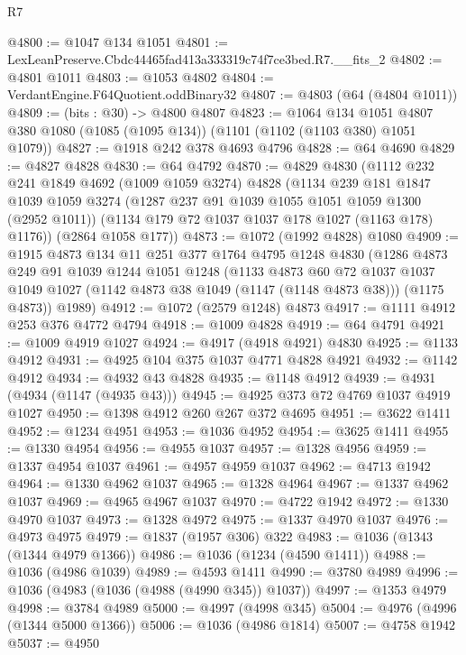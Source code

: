 \begin{lexlean}{R7}
\begin{coremodule}
@4800 := @1047 @134 @1051
@4801 := LexLeanPreserve.Cbdc44465fad413a333319c74f7ce3bed.R7.__fits_2
@4802 := @4801 @1011
@4803 := @1053 @4802
@4804 := VerdantEngine.F64Quotient.oddBinary32
@4807 := @4803 (@64 (@4804 @1011))
@4809 := (bits : @30) -> @4800 @4807
@4823 := @1064
    @134
    @1051
    @4807
    @380
    @1080
    (@1085 (@1095 @134))
    (@1101 (@1102 (@1103 @380) @1051 @1079))
@4827 := @1918 @242 @378 @4693 @4796
@4828 := @64 @4690
@4829 := @4827 @4828
@4830 := @64 @4792
@4870 := @4829
    @4830
    (@1112
      @232
      @241
      @1849
      @4692
      (@1009 @1059 @3274)
      @4828
      (@1134
        @239
        @181
        @1847
        @1039
        @1059
        @3274
        (@1287 @237 @91 @1039 @1055 @1051 @1059 @1300 (@2952 @1011))
        (@1134 @179 @72 @1037 @1037 @178 @1027 (@1163 @178) @1176))
      (@2864 @1058 @177))
@4873 := @1072 (@1992 @4828) @1080
@4909 := @1915
    @4873
    @134
    @11
    @251
    @377
    @1764
    @4795
    @1248
    @4830
    (@1286
      @4873
      @249
      @91
      @1039
      @1244
      @1051
      @1248
      (@1133
        @4873
        @60
        @72
        @1037
        @1037
        @1049
        @1027
        (@1142 @4873 @38 @1049 (@1147 (@1148 @4873 @38)))
        (@1175 @4873))
      @1989)
@4912 := @1072 (@2579 @1248) @4873
@4917 := @1111 @4912 @253 @376 @4772 @4794
@4918 := @1009 @4828
@4919 := @64 @4791
@4921 := @1009 @4919 @1027
@4924 := @4917 (@4918 @4921) @4830
@4925 := @1133 @4912
@4931 := @4925 @104 @375 @1037 @4771 @4828 @4921
@4932 := @1142 @4912
@4934 := @4932 @43 @4828
@4935 := @1148 @4912
@4939 := @4931 (@4934 (@1147 (@4935 @43)))
@4945 := @4925 @373 @72 @4769 @1037 @4919 @1027
@4950 := @1398 @4912 @260 @267 @372 @4695
@4951 := @3622 @1411
@4952 := @1234 @4951
@4953 := @1036 @4952
@4954 := @3625 @1411
@4955 := @1330 @4954
@4956 := @4955 @1037
@4957 := @1328 @4956
@4959 := @1337 @4954 @1037
@4961 := @4957 @4959 @1037
@4962 := @4713 @1942
@4964 := @1330 @4962 @1037
@4965 := @1328 @4964
@4967 := @1337 @4962 @1037
@4969 := @4965 @4967 @1037
@4970 := @4722 @1942
@4972 := @1330 @4970 @1037
@4973 := @1328 @4972
@4975 := @1337 @4970 @1037
@4976 := @4973 @4975
@4979 := @1837 (@1957 @306) @322
@4983 := @1036 (@1343 (@1344 @4979 @1366))
@4986 := @1036 (@1234 (@4590 @1411))
@4988 := @1036 (@4986 @1039)
@4989 := @4593 @1411
@4990 := @3780 @4989
@4996 := @1036 (@4983 (@1036 (@4988 (@4990 @345)) @1037))
@4997 := @1353 @4979
@4998 := @3784 @4989
@5000 := @4997 (@4998 @345)
@5004 := @4976 (@4996 (@1344 @5000 @1366))
@5006 := @1036 (@4986 @1814)
@5007 := @4758 @1942
@5037 := @4950

\end{coremodule}
\end{lexlean}
